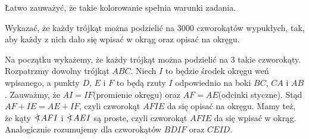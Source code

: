 \noindent
Łatwo zauważyć, że takie kolorowanie spełnia warunki zadania.

\begin{problem}{3}
	Wykazać, że każdy trójkąt można podzielić na $3000$ czworokątów wypukłych, tak, aby każdy z nich dało się wpisać w okrąg oraz opisać na okręgu.
\end{problem}

\noindent
Na początku wykażemy, że każdy trójkąt można podzielić na $3$ takie czworokąty. Rozpatrzmy dowolny trójkąt $ABC$. Niech $I$ to będzie środek okręgu weń wpisanego, a punkty $D$, $E$ i $F$ to będą rzuty $I$ odpowiednio na boki $BC$, $CA$ i $AB$. Zauważmy, że $AI = IF$(promienie okręgu) oraz $AF = AE$(odcinki styczne). Stąd $AF + IE = AE + IF$, czyli czworokąt $AFIE$ da się opisać na okręgu. Mamy też, że kąty $\an AFI$ i $\an AEI$ są proste, czyli czworokąt $AFIE$ da się wpisać w okrąg. Analogicznie rozumujemy dla czworokątów $BDIF$ oraz $CEID$.

\begin{center}
	\hspace{10px}
\end{center}

